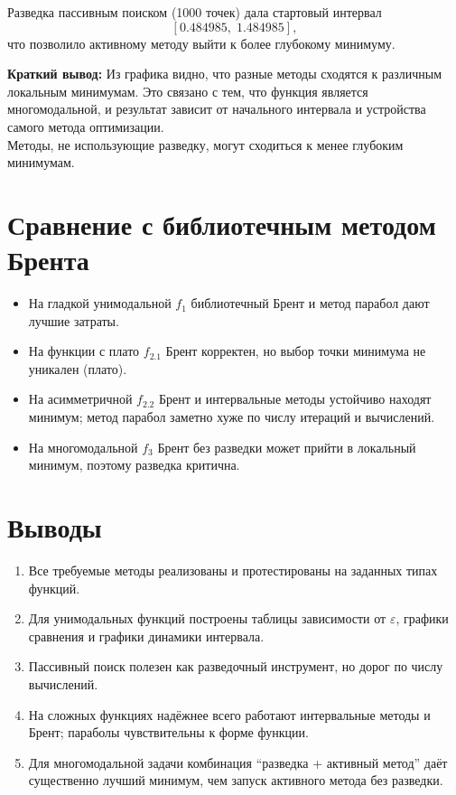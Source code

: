 \documentclass[a4paper,12pt]{article}
\begin{document}
Разведка пассивным поиском (1000 точек) дала стартовый интервал
\[
[0.484985,\; 1.484985],
\]
что позволило активному методу выйти к более глубокому минимуму.

\textbf{Краткий вывод:} Из графика видно, что разные методы сходятся к различным локальным минимумам. Это связано с тем, что функция является многомодальной, и результат зависит от начального интервала и устройства самого метода оптимизации.  \\
Методы, не использующие разведку, могут сходиться к менее глубоким минимумам.

\section{Сравнение с библиотечным методом Брента}
\begin{itemize}
    \item На гладкой унимодальной $f_1$ библиотечный Брент и метод парабол дают лучшие затраты.
    \item На функции с плато $f_{2.1}$ Брент корректен, но выбор точки минимума не уникален (плато).
    \item На асимметричной $f_{2.2}$ Брент и интервальные методы устойчиво находят минимум; метод парабол заметно хуже по числу итераций и вычислений.
    \item На многомодальной $f_3$ Брент без разведки может прийти в локальный минимум, поэтому разведка критична.
\end{itemize}

\section{Выводы}
\begin{enumerate}
    \item Все требуемые методы реализованы и протестированы на заданных типах функций.
    \item Для унимодальных функций построены таблицы зависимости от $\varepsilon$, графики сравнения и графики динамики интервала.
    \item Пассивный поиск полезен как разведочный инструмент, но дорог по числу вычислений.
    \item На сложных функциях надёжнее всего работают интервальные методы и Брент; параболы чувствительны к форме функции.
    \item Для многомодальной задачи комбинация ``разведка + активный метод'' даёт существенно лучший минимум, чем запуск активного метода без разведки.
\end{enumerate}
\end{document}
